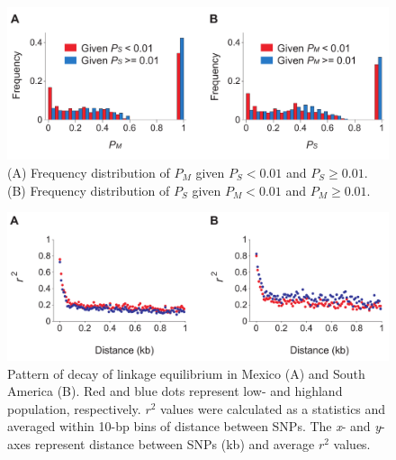 \documentclass[onecolumn,oneside,letterpaper]{article}
\begin{document}

\begin{figure}[t]
  \begin{center}
    \includegraphics[width=0.8\columnwidth]{fig/pmps.pdf}
    \caption{(A) Frequency distribution of $P_M$ given $P_S<0.01$ and $P_S\geq0.01$.  (B) Frequency distribution of $P_S$ given $P_M<0.01$ and $P_M\geq0.01$.}
    \label{colfreq}
  \end{center}
\end{figure}


\begin{figure}[t]
  \begin{center}
    \includegraphics[width=0.7\columnwidth]{fig/LD.pdf}
    \caption{Pattern of decay of linkage equilibrium in Mexico (A) and South America (B).  Red and blue dots represent low- and highland population, respectively.  $r^2$ values were calculated as a statistics and averaged within 10-bp bins of distance between SNPs.  The \emph{x}- and \emph{y}-axes represent distance between SNPs (kb) and average $r^2$ values.}
    \label{colfreq}
  \end{center}
\end{figure}
\end{document}
